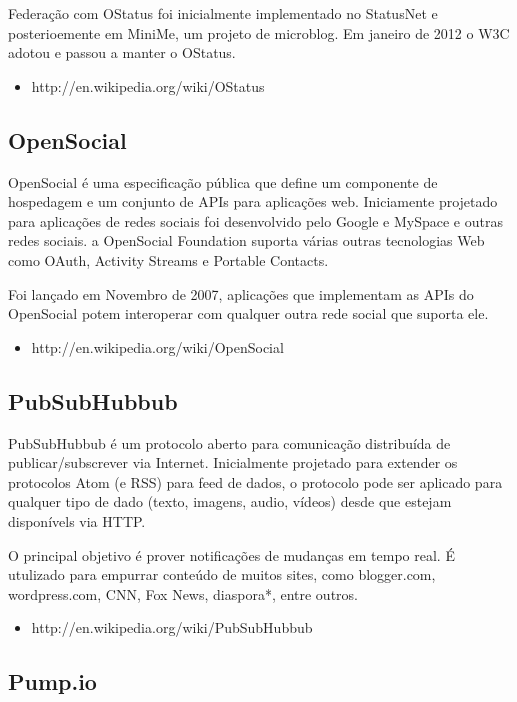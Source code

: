 \documentclass[12pt]{article}
\begin{document}
Federação com OStatus foi inicialmente implementado no StatusNet e
posterioemente em MiniMe, um projeto de microblog. Em janeiro de 2012 o W3C
adotou e passou a manter o OStatus.

\begin{itemize}
  \item http://en.wikipedia.org/wiki/OStatus
\end{itemize}

\subsection{OpenSocial}

OpenSocial é uma especificação pública que define um componente de hospedagem
e um conjunto de APIs para aplicações web. Iniciamente projetado para
aplicações de redes sociais foi desenvolvido pelo Google e MySpace e outras
redes sociais. a OpenSocial Foundation suporta várias outras tecnologias Web
como OAuth, Activity Streams e Portable Contacts.

Foi lançado em Novembro de 2007, aplicações que implementam as APIs do
OpenSocial potem interoperar com qualquer outra rede social que suporta ele.

\begin{itemize}
  \item http://en.wikipedia.org/wiki/OpenSocial
\end{itemize}

\subsection{PubSubHubbub}

PubSubHubbub é um protocolo aberto para comunicação distribuída de
publicar/subscrever via Internet. Inicialmente projetado para extender os
protocolos Atom (e RSS) para feed de dados, o protocolo pode ser aplicado para
qualquer tipo de dado (texto, imagens, audio, vídeos) desde que estejam
disponívels via HTTP.

O principal objetivo é prover notificações de mudanças em tempo real. É
utulizado para empurrar conteúdo de muitos sites, como blogger.com,
wordpress.com, CNN, Fox News, diaspora*, entre outros.

\begin{itemize}
  \item http://en.wikipedia.org/wiki/PubSubHubbub
\end{itemize}

\subsection{Pump.io}
\end{document}
